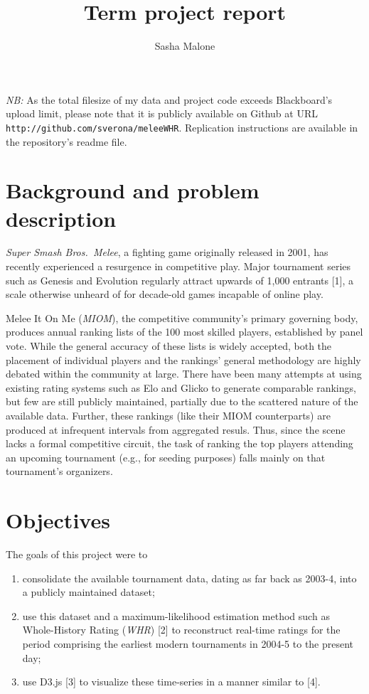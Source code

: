 \documentclass[10pt]{article}
\title{Term project report}
\author{Sasha Malone}
\theoremstyle{definition}
\theoremstyle{remark}
\providecommand{\tightlist}{%
      \setlength{\itemsep}{0pt}\setlength{\parskip}{0pt}}
\begin{document}
\emph{NB:} As the total filesize of my data and project code exceeds
Blackboard's upload limit, please note that it is publicly available on Github
at URL \texttt{http://github.com/sverona/meleeWHR}. Replication instructions
are available in the repository's readme file.

\hypertarget{background-and-problem-description}{%
\section{Background and problem description}\label{background-and-problem-description}}

\emph{Super Smash Bros.~Melee}, a fighting game
originally released in 2001, has recently experienced a resurgence in
competitive play. Major tournament series such as Genesis and Evolution
regularly attract upwards of 1,000 entrants {[}1{]}, a scale otherwise
unheard of for decade-old games incapable of online play.

Melee It On Me (\emph{MIOM}), the competitive community's primary
governing body, produces annual ranking lists of the 100 most skilled
players, established by panel vote. While the general accuracy of these
lists is widely accepted, both the placement of individual players and
the rankings' general methodology are highly debated within the community
at large. There have been many attempts at using existing rating systems such
as Elo and Glicko to generate comparable rankings, but few are still
publicly maintained, partially due to the scattered nature of the
available data. Further, these rankings (like their MIOM counterparts)
are produced at infrequent intervals from aggregated resuls. Thus, since
the scene lacks a formal competitive circuit, the task of ranking the
top players attending an upcoming tournament (e.g., for seeding
purposes) falls mainly on that tournament's organizers.

\hypertarget{objectives}{%
\section{Objectives}\label{objectives}}

The goals of this project were to

\begin{enumerate}
\def\labelenumi{\roman{enumi}.}
\tightlist
\item
  consolidate the available tournament data, dating as far back as
  2003-4, into a publicly maintained dataset;
\item
  use this dataset and a maximum-likelihood estimation method such as
  Whole-History Rating (\emph{WHR}) {[}2{]} to reconstruct real-time
  ratings for the period comprising the earliest modern tournaments in
  2004-5 to the present day;
\item
  use D3.js {[}3{]} to visualize these time-series in a manner similar
  to {[}4{]}.
\end{enumerate}
\end{document}
